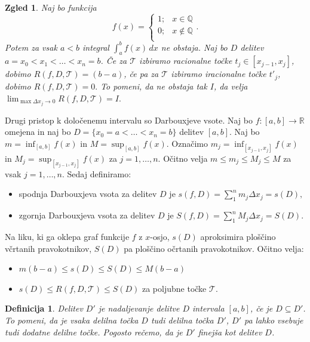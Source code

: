 \documentclass[10pt, a4paper]{article}
\newtheorem{defi}[izr]{Definicija}
\newenvironment{noticeB}{%
  \tcolorbox[%
  notitle,
  empty,
  enhanced,  %
  breakable,
  coltext=black,
  colback=white, 
  fontupper=\rmfamily,
  noparskip,
  sharp corners,
  boxrule=-1pt,  %
  frame hidden,
  left=7pt,  %
  right=7pt,
  top=5pt,
  bottom=5pt,
  before skip=2.5ex plus 2pt,
  after skip=2.5ex plus 2pt,
  borderline west = {1.5pt}{-0.1pt}{blue!30!black}, %
  overlay unbroken and last={%
    \draw[color=black, line width=1.25pt]
    ($(frame.south west)+(1.pt, -0.1pt)$) -- ++(2em, 0);
  }
  ]}
{\endtcolorbox}
\newenvironment{definicija}{\begin{noticeB}\begin{defi}}{%
\end{defi}\end{noticeB}}
\newtheorem{zgled}[izr]{Zgled}
\newcommand{\Q}{\mathbb {Q}}
\newcommand{\R}{\mathbb {R}}
\newcommand{\limf}[3]{\lim_{#1 \to #2} {#3}}
\begin{document}
\begin{zgled}
    Naj bo funkcija $$f(x) = \begin{cases}
        1 ;& x \in \Q\\
        0;& x \notin \Q\\
    \end{cases}.$$ Potem za vsak $a < b$ integral $\int_a ^b f(x)\,dx$ ne obstaja.
    Naj bo $D$ delitev $a = x_0 < x_1 < \dots < x_n = b$.
    Če za $\mathcal{T}$ izbiramo racionalne točke $t_j \in [x_{j-1}, x_j]$, dobimo $R(f, D, \mathcal{T}) = (b-a)$, 
    če pa za $\mathcal{T}$ izbiramo iracionalne točke $t'_j$, dobimo $R(f, D, \mathcal{T}) = 0.$
    To pomeni, da ne obstaja tak $I$, da velja $\limf{\max \Delta x_j}{0}{R(f, D, \mathcal{T})} = I.$
\end{zgled}

Drugi pristop k določenemu intervalu so Darbouxjeve vsote.
Naj bo $f: [a, b] \rightarrow \R$ omejena in naj bo $D = \{x_0 = a < \dots < x_n = b\}$ delitev $[a, b]$.
Naj bo $m = \inf_{[a,b]} f(x)$ in $M = \sup_{[a,b]} f(x)$.
Označimo $m_j = \inf_{[x_{j-1}, x_j]} f(x)$ in $M_j = \sup_{[x_{j-1}, x_j]} f(x)$ za $j = 1, \dots, n$.
Očitno velja $m \leq m_j \leq M_j \leq M$ za vsak $j = 1, \dots, n$.
Sedaj definiramo:
\begin{itemize}
    \item spodnja Darbouxjeva vsota za delitev $D$ je
    $s(f, D) = \sum_1 ^n m_j \Delta x_j = s(D),$
    \item zgornja Darbouxjeva vsota za delitev $D$ je
    $S(f, D) = \sum_1 ^n M_j \Delta x_j = S(D).$
\end{itemize}
Na liku, ki ga oklepa graf funkcije $f$ z $x$-osjo, $s(D)$ aproksimira ploščino včrtanih pravokotnikov, $S(D)$ pa ploščino očrtanih pravokotnikov.
Očitno velja:
\begin{itemize}
    \item $m(b - a) \leq s(D) \leq S(D) \leq M(b-a)$
    \item $s(D) \leq R(f, D, \mathcal{T}) \leq S(D)$ za poljubne točke $\mathcal{T}$.
\end{itemize}

\begin{definicija}
    Delitev $D'$ je nadaljevanje delitve $D$ intervala $[a, b]$, če je $D \subseteq D'$.
    To pomeni, da je vsaka delilna točka $D$ tudi delilna točka $D'$, $D'$ pa lahko vsebuje tudi dodatne delilne točke.
    Pogosto rečemo, da je $D'$ finejša kot delitev $D$.
\end{definicija}
\end{document}
